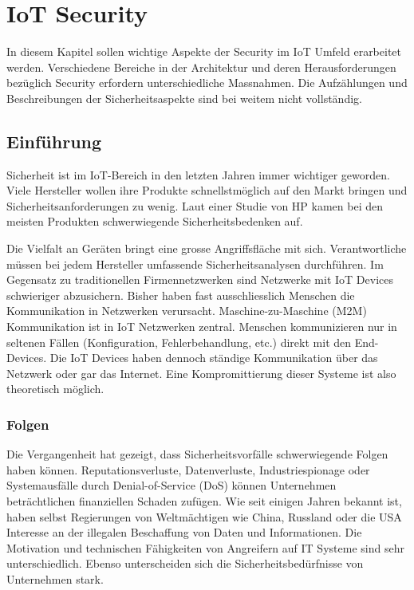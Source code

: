 \chapter{IoT Security}
In diesem Kapitel sollen wichtige Aspekte der Security im IoT Umfeld erarbeitet werden. Verschiedene Bereiche in der Architektur und deren Herausforderungen bezüglich Security erfordern unterschiedliche Massnahmen. Die Aufzählungen und Beschreibungen der Sicherheitsaspekte sind bei weitem nicht vollständig.
\section{Einführung}
Sicherheit ist im IoT-Bereich in den letzten Jahren immer wichtiger geworden. Viele Hersteller wollen ihre Produkte schnellstmöglich auf den Markt bringen und Sicherheitsanforderungen zu wenig. Laut einer Studie von HP kamen bei den meisten Produkten schwerwiegende Sicherheitsbedenken auf.\cite{SecOverview} 

Die Vielfalt an Geräten bringt eine grosse Angriffsfläche mit sich. Verantwortliche müssen bei jedem Hersteller umfassende Sicherheitsanalysen durchführen. Im Gegensatz zu traditionellen Firmennetzwerken sind Netzwerke mit IoT Devices schwieriger abzusichern. Bisher haben fast ausschliesslich Menschen die Kommunikation in Netzwerken verursacht. Maschine-zu-Maschine (M2M) Kommunikation ist in IoT Netzwerken zentral. Menschen kommunizieren nur in seltenen Fällen (Konfiguration, Fehlerbehandlung, etc.) direkt mit den End-Devices. Die IoT Devices haben dennoch ständige Kommunikation über das Netzwerk oder gar das Internet. Eine Kompromittierung dieser Systeme ist also theoretisch möglich.

\subsection{Folgen}
Die Vergangenheit hat gezeigt, dass Sicherheitsvorfälle schwerwiegende Folgen haben können. Reputationsverluste, Datenverluste, Industriespionage oder Systemausfälle durch Denial-of-Service (DoS) können Unternehmen beträchtlichen finanziellen Schaden zufügen. Wie seit einigen Jahren bekannt ist, haben selbst Regierungen von Weltmächtigen wie China, Russland oder die USA Interesse an der illegalen Beschaffung von Daten und Informationen. Die Motivation und technischen Fähigkeiten von Angreifern auf IT Systeme sind sehr unterschiedlich. Ebenso unterscheiden sich die Sicherheitsbedürfnisse von Unternehmen stark.

